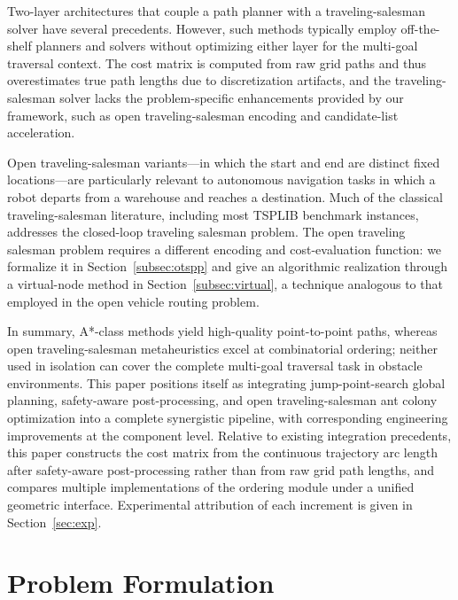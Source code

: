 \documentclass[lettersize,journal]{IEEEtran}
\begin{document}
Two-layer architectures that couple a path planner with a traveling-salesman solver have several precedents\textcolor{blue}{\cite{ref1,ref2}}. However, such methods typically employ off-the-shelf planners and solvers without optimizing either layer for the multi-goal traversal context. The cost matrix is computed from raw grid paths and thus overestimates true path lengths due to discretization artifacts, and the traveling-salesman solver lacks the problem-specific enhancements provided by our framework, such as open traveling-salesman encoding and candidate-list acceleration.

Open traveling-salesman variants---in which the start and end are distinct fixed locations---are particularly relevant to autonomous navigation tasks in which a robot departs from a warehouse and reaches a destination. Much of the classical traveling-salesman literature, including most TSPLIB benchmark instances, addresses the closed-loop traveling salesman problem. The open traveling salesman problem requires a different encoding and cost-evaluation function: we formalize it in Section~\textcolor{blue}{\ref{subsec:otspp}} and give an algorithmic realization through a virtual-node method in Section~\textcolor{blue}{\ref{subsec:virtual}}, a technique analogous to that employed in the open vehicle routing problem\textcolor{blue}{\cite{ref32}}.

In summary, A*-class methods yield high-quality point-to-point paths, whereas open traveling-salesman metaheuristics excel at combinatorial ordering; neither used in isolation can cover the complete multi-goal traversal task in obstacle environments. This paper positions itself as integrating jump-point-search global planning, safety-aware post-processing, and open traveling-salesman ant colony optimization into a complete synergistic pipeline, with corresponding engineering improvements at the component level. Relative to existing integration precedents\textcolor{blue}{\cite{ref1,ref2}}, this paper constructs the cost matrix from the continuous trajectory arc length after safety-aware post-processing rather than from raw grid path lengths, and compares multiple implementations of the ordering module under a unified geometric interface. Experimental attribution of each increment is given in Section~\textcolor{blue}{\ref{sec:exp}}.

\section{Problem Formulation}
\label{sec:form}
\end{document}
